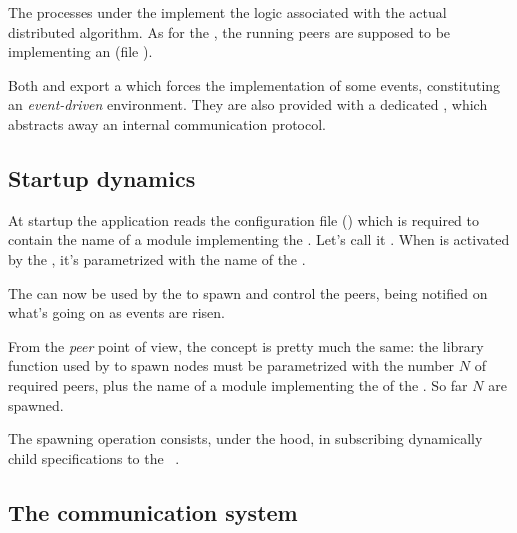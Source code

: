 The processes under the   implement the
logic associated with the actual distributed algorithm. As for the
, the running peers are supposed to be
 implementing an 
(file ).

Both  and  export a 
which forces the implementation of some events, constituting an
\emph{event-driven} environment. They are also provided with a dedicated
, which abstracts away an internal communication protocol.


\subsection{Startup dynamics} \label{sub:StartupDynamics}

At startup the application reads the configuration file
() which is required to contain the name of a module
implementing the  . Let's call it
. When  is activated by the
 , it's parametrized with the name of
the .

The  can now be used by the  to spawn
and control the peers, being notified on what's going on as events are
risen.

From the \emph{peer} point of view, the concept is pretty much the same:
the library function used by  to spawn nodes must
be parametrized with the number $N$ of required peers, plus the name of a
module implementing the  of the 
. So far $N$  are
spawned.

The spawning operation consists, under the hood, in subscribing
dynamically child specifications to the  \OTP\
.


\subsection{The communication system}

